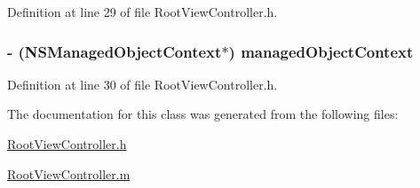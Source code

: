 Definition at line 29 of file RootViewController.h.

\hypertarget{interface_root_view_controller_adeebe5deeb50f760daa2b23db0a20d95}{
\subsubsection[{managedObjectContext}]{\setlength{\rightskip}{0pt plus 5cm}-\/ (NSManagedObjectContext$\ast$) managedObjectContext}}
\label{interface_root_view_controller_adeebe5deeb50f760daa2b23db0a20d95}


Definition at line 30 of file RootViewController.h.



The documentation for this class was generated from the following files:\begin{DoxyCompactItemize}
\item 
\hyperlink{_root_view_controller_8h}{RootViewController.h}\item 
\hyperlink{_root_view_controller_8m}{RootViewController.m}\end{DoxyCompactItemize}
